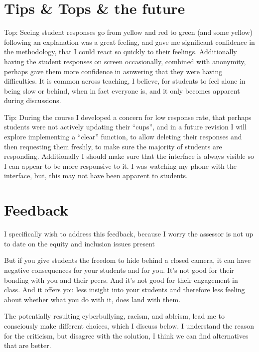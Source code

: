 \documentclass[paper=a4,justified,a4paper]{tufte-handout}
\begin{document}
\hypertarget{tips-tops-the-future}{%
\section{Tips \& Tops \& the future}\label{tips-tops-the-future}}

Top: Seeing student responses go from yellow and red to green (and some
yellow) following an explanation was a great feeling, and gave me
significant confidence in the methodology, that I could react so quickly
to their feelings. Additionally having the student responses on screen
occasionally, combined with anonymity, perhaps gave them more confidence
in asnwering that they were having difficulties. It is common across
teaching, I believe, for students to feel alone in being slow or behind,
when in fact everyone is, and it only becomes apparent during
discussions.

Tip: During the course I developed a concern for low response rate, that
perhaps students were not actively updating their ``cups'', and in a
future revision I will explore implementing a ``clear'' function, to
allow deleting their responses and then requesting them freshly, to make
sure the majority of students are responding. Additionally I should make
sure that the interface is always visible so I can appear to be more
responsive to it. I was watching my phone with the interface, but, this
may not have been apparent to students.

\hypertarget{feedback}{%
\section{Feedback}\label{feedback}}

I specifically wish to address this feedback, because I worry the
assessor is not up to date on the equity and inclusion issues present

\begin{myquote}
But if you give students the freedom to hide behind a closed camera, it
can have negative consequences for your students and for you. It's not
good for their bonding with you and their peers. And it's not good for
their engagement in class. And it offers you less insight into your
students and therefore less feeling about whether what you do with it,
does land with them.
\end{myquote}

The potentially resulting cyberbullying, racism, and ableism, lead me to
consciously make different choices, which I discuss below. I understand
the reason for the criticism, but disagree with the solution, I think we
can find alternatives that are better.
\end{document}
